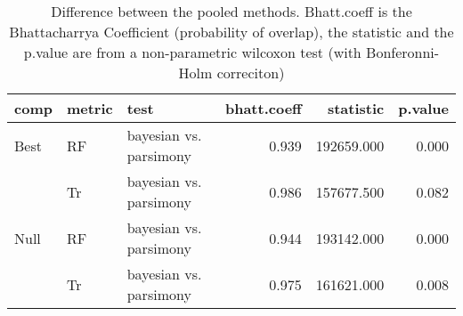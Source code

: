 \begin{table}[ht]
\centering
\begin{tabular}{lllrrr}
  \hline
comp & metric & test & bhatt.coeff & statistic & p.value \\ 
  \hline
Best & RF & bayesian vs. parsimony & 0.939 & 192659.000 & 0.000 \\ 
   & Tr & bayesian vs. parsimony & 0.986 & 157677.500 & 0.082 \\ 
  Null & RF & bayesian vs. parsimony & 0.944 & 193142.000 & 0.000 \\ 
   & Tr & bayesian vs. parsimony & 0.975 & 161621.000 & 0.008 \\ 
   \hline
\end{tabular}
\caption{Difference between the pooled methods. Bhatt.coeff is the Bhattacharrya Coefficient (probability of overlap), the statistic and the p.value are from a non-parametric wilcoxon test (with Bonferonni-Holm correciton)} 
\label{Full_Tab_pooledsmethods_test}
\end{table}
